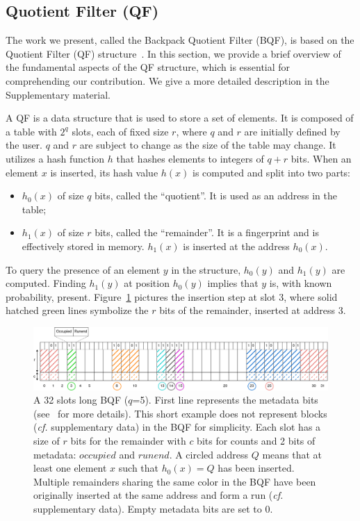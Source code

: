 \subsection{Quotient Filter (QF)}
The work we present, called the Backpack Quotient Filter (BQF), is based on the Quotient Filter (QF) structure~\cite{quotient_filter_2012}. In this section, we provide a brief overview of the fundamental aspects of the QF structure, which is essential for comprehending our contribution. We give a more detailed description in the Supplementary material.

A QF is a data structure that is used to store a set of elements.
It is composed of a table with $2^q$ slots, each of fixed size $r$, where $q$ and $r$ are initially defined by the user. $q$ and $r$ are subject to change as the size of the table may change.
It utilizes a hash function $h$ that hashes elements to integers of $q+r$ bits.
When an element $x$ is inserted, its hash value $h(x)$ is computed and split into two parts: 
\begin{itemize}
    \item $h_0(x)$ of size $q$ bits, called the ``quotient''. It is used as an address in the table;
  \item $h_1(x)$ of size $r$ bits, called the ``remainder''. It is a fingerprint and is effectively stored in memory. $h_1(x)$ is inserted at the address $h_0(x)$.
\end{itemize}

To query the presence of an element $y$ in the structure, $h_0(y)$ and $h_1(y)$ are computed. Finding $h_1(y)$ at position $h_0(y)$ implies that $y$ is, with known probability, present.
Figure~\ref{fig:BQF} pictures the insertion step at slot 3, where solid hatched green lines symbolize the $r$ bits of the remainder, inserted at address 3.

\begin{figure}[ht]
   \includegraphics[width=\textwidth]{figures/paperII/example.png}
   \caption{A 32 slots long BQF ($q$=5). First line represents the metadata bits (see~\cite{counting_quotient_filter_2017} for more details). This short example does not represent blocks (\textit{cf.} supplementary data) in the BQF for simplicity. Each slot has a size of $r$ bits for the remainder with $c$ bits for counts and 2 bits of metadata: $occupied$ and $runend$. A circled address $Q$ means that at least one element $x$ such that $h_0(x) = Q$ has been inserted. Multiple remainders sharing the same color in the BQF have been originally inserted at the same address and form a run (\textit{cf.} supplementary data). Empty metadata bits are set to 0.}
   \label{fig:BQF}
\end{figure}

